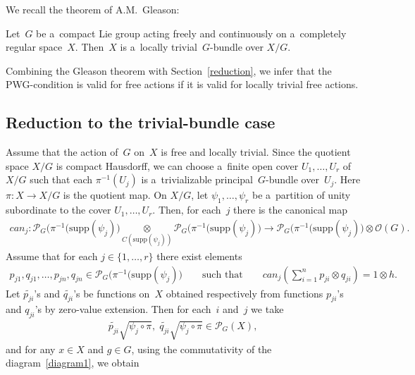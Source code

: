 \documentclass[pdftex]{sigma}
\begin{document}
We recall the theorem of A.M.~Gleason:
\begin{theorem}[\cite{g-am50}] Let~$G$ be a~compact Lie group acting freely and continuously on a~completely regular space~$X$.
Then~$X$ is a~locally trivial~$G$-bundle over $X/G$.
\end{theorem}

Combining the Gleason theorem with Section~\ref{reduction}, we infer that the PWG-condition is valid for free actions if it
is valid for locally trivial free actions.

\subsection{Reduction to the trivial-bundle case}\label{tbundle}

Assume that the action of~$G$ on~$X$ is free and locally trivial.
Since the quotient space $X/G$ is compact Hausdorf\/f, we can choose a~f\/inite open cover $U_1,\ldots,U_r$ of $X/G$ such
that each $\pi^{-1}(U_j)$ is a~trivializable principal~$G$-bundle over~$U_j$.
Here $\pi\colon X\to X/G$ is the quotient map.
On $X/G$, let $\psi_1,\ldots,\psi_r$ be a~partition of unity subordinate to the cover $U_1,\ldots,U_r$.
Then, for each~$j$ there is the canonical map
\begin{gather*}
{can}_j\colon \mathcal{P}_G\big(\pi^{-1}(\mathrm{supp}(\psi_j)\big)\underset{C(\mathrm{supp}(\psi_j))} {\otimes}
\mathcal{P}_G\big(\pi^{-1}(\mathrm{supp}(\psi_j)\big) \longrightarrow
\mathcal{P}_G\big(\pi^{-1}(\mathrm{supp}(\psi_j)\big)\otimes{\mathcal O}(G).
\end{gather*}
Assume that for each $j\in\{1,\ldots,r\}$ there exist elements
\begin{gather*}
p_{j1},q_{j1},\ldots,p_{jn},q_{jn}\in \mathcal{P}_G\big(\pi^{-1}(\mathrm{supp}(\psi_j)\big)
\qquad
\text{such that}
\qquad
{can}_j\left(\sum\limits_{i=1}^n p_{ji}\otimes q_{ji}\right)=1\otimes h.
\end{gather*}
Let $\widetilde{p_{ji}}$'s and $\widetilde{q_{ji}}$'s be functions on~$X$ obtained respectively from functions
$p_{ji}$'s and $q_{ji}$'s by zero-value extension.
Then for each~$i$ and~$j$ we take
\begin{gather*}
\widetilde{p_{ji}}\sqrt{\psi_j\circ\pi},\; \widetilde{q_{ji}}\sqrt{\psi_j\circ\pi}
\in\mathcal{P}_G(X),
\end{gather*}
and for any $x\in X$ and $g\in G$, using the commutativity of the diagram~\eqref{diagram1}, we obtain
\end{document}

